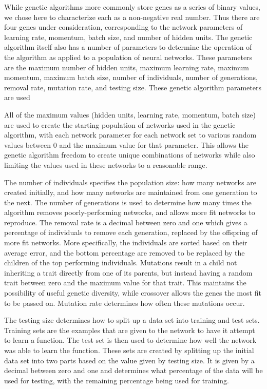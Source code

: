 \documentclass[10pt, conference, compsocconf]{IEEEtran}
\begin{document}
While genetic algorithms more commonly store genes as a series of binary values, we chose here to characterize each as a non-negative real number. Thus there are four genes under consideration, corresponding to the network parameters of learning rate, momentum, batch size, and number of hidden units. The genetic algorithm itself also has a number of parameters to determine the operation of the algorithm as applied to a population of neural networks. These parameters are the maximum number of hidden units, maximum learning rate, maximum momentum, maximum batch size, number of individuals, number of generations, removal rate, mutation rate, and testing size. These genetic algorithm parameters are used 

All of the maximum values (hidden units, learning rate, momentum, batch size) are used to create the starting population of networks used in the genetic algorithm, with each network parameter for each network set to various random values between 0 and the maximum value for that parameter. This allows the genetic algorithm freedom to create unique combinations of networks while also limiting the values used in these networks to a reasonable range.

The number of individuals specifies the population size: how many networks are created initially, and how many networks are maintained from one generation to the next. The number of generations is used to determine how many times the algorithm removes poorly-performing networks, and allows more fit networks to reproduce. The removal rate is a decimal between zero and one which gives a percentage of individuals to remove each generation, replaced by the offspring of more fit networks. More specifically, the individuals are sorted based on their average error, and the bottom percentage are removed to be replaced by the children of the top performing individuals. Mutations result in a child not inheriting a trait directly from one of its parents, but instead having a random trait between zero and the maximum value for that trait. This maintains the possibility of useful genetic diversity, while crossover allows the genes the most fit to be passed on. Mutation rate determines how often these mutations occur.

The testing size determines how to split up a data set into training and test sets. Training sets are the examples that are given to the network to have it attempt to learn a function. The test set is then used to determine how well the network was able to learn the function. These sets are created by splitting up the initial data set into two parts based on the value given by testing size. It is given by a decimal between zero and one and determines what percentage of the data will be used for testing, with the remaining percentage being used for training.
\end{document}
